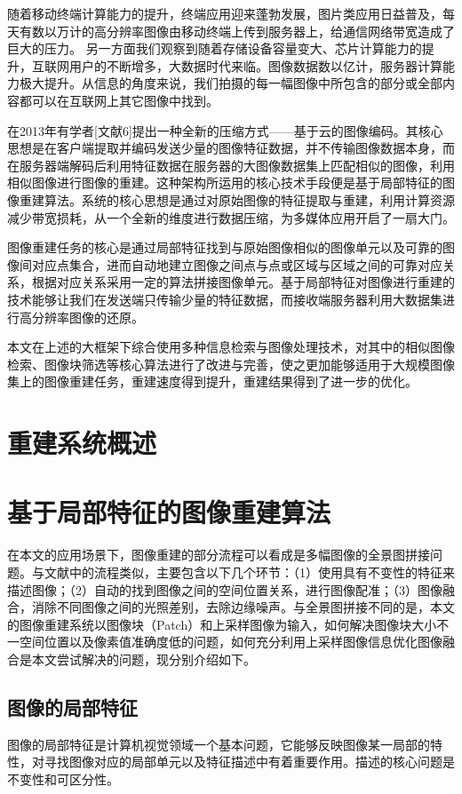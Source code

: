 \documentclass[UTF8]{csoarticle}
\begin{document}
随着移动终端计算能力的提升，终端应用迎来蓬勃发展，图片类应用日益普及，每天有数以万计的高分辨率图像由移动终端上传到服务器上，给通信网络带宽造成了巨大的压力。
另一方面我们观察到随着存储设备容量变大、芯片计算能力的提升，互联网用户的不断增多，大数据时代来临。图像数据数以亿计，服务器计算能力极大提升。从信息的角度来说，我们拍摄的每一幅图像中所包含的部分或全部内容都可以在互联网上其它图像中找到。

在2013年有学者[文献6]提出一种全新的压缩方式——基于云的图像编码。其核心思想是在客户端提取并编码发送少量的图像特征数据，并不传输图像数据本身，而在服务器端解码后利用特征数据在服务器的大图像数据集上匹配相似的图像，利用相似图像进行图像的重建。这种架构所运用的核心技术手段便是基于局部特征的图像重建算法。系统的核心思想是通过对原始图像的特征提取与重建，利用计算资源减少带宽损耗，从一个全新的维度进行数据压缩，为多媒体应用开启了一扇大门。

图像重建任务的核心是通过局部特征找到与原始图像相似的图像单元以及可靠的图像间对应点集合，进而自动地建立图像之间点与点或区域与区域之间的可靠对应关系，根据对应关系采用一定的算法拼接图像单元。基于局部特征对图像进行重建的技术能够让我们在发送端只传输少量的特征数据，而接收端服务器利用大数据集进行高分辨率图像的还原。

本文在上述的大框架下综合使用多种信息检索与图像处理技术，对其中的相似图像检索、图像块筛选等核心算法进行了改进与完善，使之更加能够适用于大规模图像集上的图像重建任务，重建速度得到提升，重建结果得到了进一步的优化。

\section{重建系统概述}

\section{基于局部特征的图像重建算法}
在本文的应用场景下，图像重建的部分流程可以看成是多幅图像的全景图拼接问题。与文献\cite{Brown:2006ir}中的流程类似，主要包含以下几个环节：（1）使用具有不变性的特征来描述图像；（2）自动的找到图像之间的空间位置关系，进行图像配准；（3）图像融合，消除不同图像之间的光照差别，去除边缘噪声。与全景图拼接不同的是，本文的图像重建系统以图像块（Patch）和上采样图像为输入，如何解决图像块大小不一空间位置以及像素值准确度低的问题，如何充分利用上采样图像信息优化图像融合是本文尝试解决的问题，现分别介绍如下。

\subsection{图像的局部特征}
图像的局部特征是计算机视觉领域一个基本问题，它能够反映图像某一局部的特性，对寻找图像对应的局部单元以及特征描述中有着重要作用。描述的核心问题是不变性和可区分性。
\end{document}
